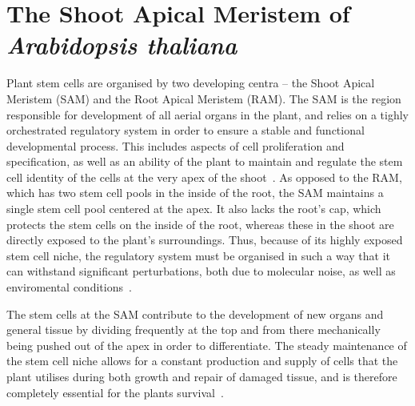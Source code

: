 
\section{The Shoot Apical Meristem of \textit{Arabidopsis thaliana}} %
\label{sec:arabidopsis}
Plant stem cells are organised by two developing centra -- the Shoot Apical
Meristem (SAM) and the Root Apical Meristem (RAM). The SAM is the region
responsible for development of all aerial organs in the plant, and relies on a
tighly orchestrated regulatory system in order to ensure a stable and functional
developmental process. This includes
aspects of cell proliferation and specification, as well as an ability of the plant to
maintain and regulate the stem cell identity of the cells at the very apex of
the shoot~\cite{clark2001cell}. As opposed to the RAM, which has two stem cell pools in the
inside of the root, the SAM maintains a single stem cell pool centered at the
apex. It also lacks the root's cap, which protects the stem cells on the inside
of the root, whereas these in the shoot are directly exposed to the plant's
surroundings. Thus, because of its highly exposed stem cell niche, the 
regulatory system must be organised in such a way that it can withstand
significant perturbations, both due to molecular noise, as well as enviromental
conditions~\cite{heidstra2014plant}.

The stem cells at the SAM contribute to the development of new organs and
general tissue by dividing frequently at the top and from there 
mechanically being pushed out of the apex in order to differentiate. The steady
maintenance of the stem cell niche allows for a constant production and supply
of cells that the plant utilises during both growth and repair of damaged
tissue, and is therefore completely essential for the plants
survival~\cite{heidstra2014plant}.

